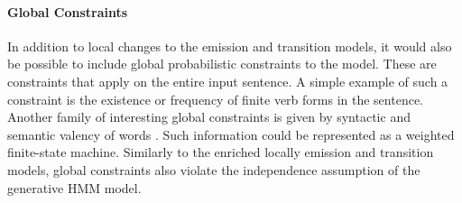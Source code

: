 \paragraph{Global Constraints} In addition to local changes to the
emission and transition models, it would also be possible to include
global probabilistic constraints to the model. These are constraints
that apply on the entire input sentence. A simple example of such a
constraint is the existence or frequency of finite verb forms in the
sentence. Another family of interesting global constraints is given by
syntactic and semantic valency of words \citep{Baker1998}. Such
information could be represented as a weighted finite-state
machine. Similarly to the enriched locally emission and transition
models, global constraints also violate the independence assumption of
the generative HMM model.








